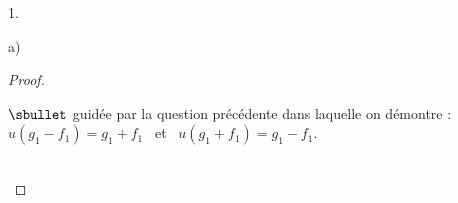 \documentclass[11pt]{article}%
\begin{document}
\begin{noliste}{1.}
\begin{noliste}{a)}
\begin{proof}
\begin{remark}
\begin{noliste}{$\sbullet$}
      guidée par la question précédente dans laquelle on démontre :
      $u(g_1 - f_1) = g_1 + f_1$ \ et \ $u(g_1 + f_1) = g_1 - f_1$.
    \end{noliste}
    \end{remark}~\\[-1.4cm]
\end{proof}
\end{noliste}

\end{noliste}
\end{document}
